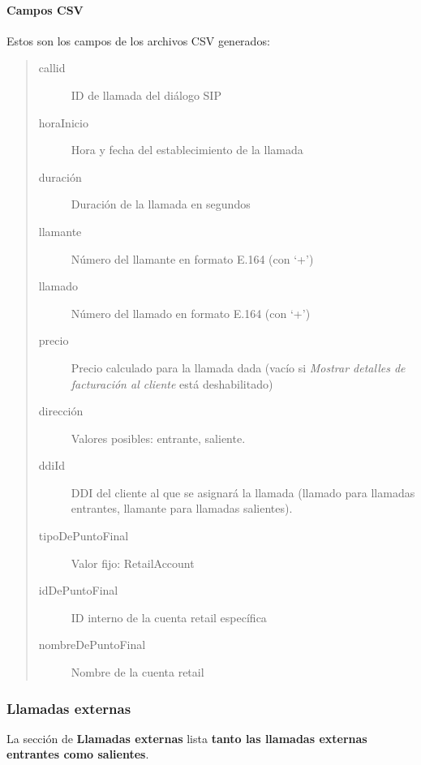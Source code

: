 \documentclass[letterpaper,10pt,spanish]{sphinxmanual}
\begin{document}
\paragraph{Campos CSV}
\label{administration_portal/client/retail/calls/call_csv_schedulers:csv-fields}
Estos son los campos de los archivos CSV generados:
\begin{quote}
\begin{description}
\item[{callid}] \leavevmode
ID de llamada del diálogo SIP

\item[{horaInicio}] \leavevmode
Hora y fecha del establecimiento de la llamada

\item[{duración}] \leavevmode
Duración de la llamada en segundos

\item[{llamante}] \leavevmode
Número del llamante en formato E.164 (con `+')

\item[{llamado}] \leavevmode
Número del llamado en formato E.164 (con `+')

\item[{precio}] \leavevmode
Precio calculado para la llamada dada (vacío si \emph{Mostrar detalles de facturación al cliente} está deshabilitado)

\item[{dirección}] \leavevmode
Valores posibles: entrante, saliente.

\item[{ddiId}] \leavevmode
DDI del cliente al que se asignará la llamada (llamado para llamadas entrantes, llamante para llamadas salientes).

\item[{tipoDePuntoFinal}] \leavevmode
Valor fijo: RetailAccount

\item[{idDePuntoFinal}] \leavevmode
ID interno de la cuenta retail específica

\item[{nombreDePuntoFinal}] \leavevmode
Nombre de la cuenta retail

\end{description}
\end{quote}


\subsubsection{Llamadas externas}
\label{administration_portal/client/retail/calls/call_recordings::doc}\label{administration_portal/client/retail/calls/call_recordings:external-calls}
La sección de \textbf{Llamadas externas} lista \textbf{tanto las llamadas externas entrantes como salientes}.
\end{document}
